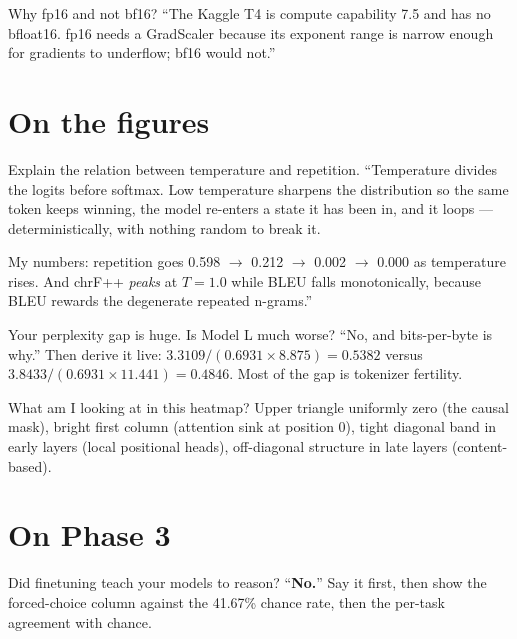 \documentclass[11pt]{report}
\begin{document}
\begin{qabox}{Why fp16 and not bf16?}
``The Kaggle T4 is compute capability 7.5 and has no bfloat16. fp16 needs a
GradScaler because its exponent range is narrow enough for gradients to
underflow; bf16 would not.''
\end{qabox}

\section{On the figures}

\begin{qabox}{Explain the relation between temperature and repetition.}
``Temperature divides the logits before softmax. Low temperature sharpens the
distribution so the same token keeps winning, the model re-enters a state it has
been in, and it loops --- deterministically, with nothing random to break it.

My numbers: repetition goes 0.598 $\rightarrow$ 0.212 $\rightarrow$ 0.002
$\rightarrow$ 0.000 as temperature rises. And chrF++ \emph{peaks} at $T=1.0$
while BLEU falls monotonically, because BLEU rewards the degenerate repeated
n-grams.''
\end{qabox}

\begin{qabox}{Your perplexity gap is huge. Is Model L much worse?}
``No, and bits-per-byte is why.'' Then derive it live:
$3.3109 / (0.6931 \times 8.875) = 0.5382$ versus
$3.8433 / (0.6931 \times 11.441) = 0.4846$. Most of the gap is tokenizer
fertility.
\end{qabox}

\begin{qabox}{What am I looking at in this heatmap?}
Upper triangle uniformly zero (the causal mask), bright first column (attention
sink at position 0), tight diagonal band in early layers (local positional
heads), off-diagonal structure in late layers (content-based).
\end{qabox}

\section{On Phase 3}

\begin{qabox}{Did finetuning teach your models to reason?}
``\textbf{No.}'' Say it first, then show the forced-choice column against the
41.67\% chance rate, then the per-task agreement with chance.
\end{qabox}
\end{document}
